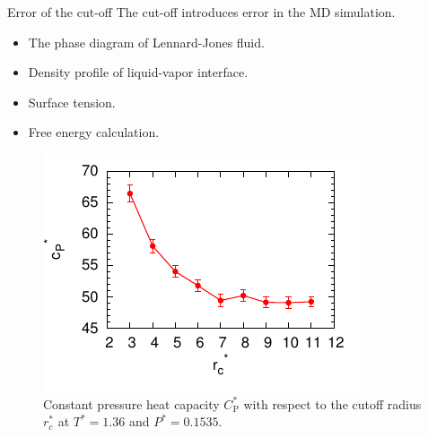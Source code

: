 \documentclass{beamer}
\begin{document}
\begin{frame}{Error of the cut-off}
  The cut-off introduces error in the MD simulation.
  \begin{itemize}
  \item The phase diagram of Lennard-Jones fluid.
  \item Density profile of liquid-vapor interface.
  \item Surface tension.
  \item Free energy calculation.
  \end{itemize}
  \begin{figure}
    \centering
    \begin{minipage}[c]{.54\linewidth}
      \centering
      \includegraphics[width=1.\textwidth]{figs/short-range//natom-rcut-c.pdf}
    \end{minipage}
    \begin{minipage}[c]{.44\linewidth}
      \centering
      \caption{Constant pressure heat capacity $C_{\textrm{P}}^\ast$
        with respect to the cutoff radius $r_c^\ast$ at $T^\ast =
        1.36$ and $P^\ast = 0.1535$. }
    \end{minipage}
  \end{figure}
\end{frame}
\end{document}
